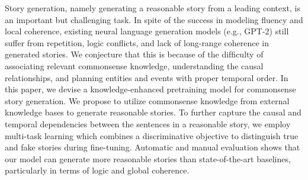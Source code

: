 Story generation, namely generating a reasonable story from a leading context, is an important but challenging task. In spite of the success in modeling fluency and local coherence, existing neural language generation models (e.g., GPT-2) still suffer from repetition, logic conﬂicts, and lack of long-range coherence in generated stories. We conjecture that this is because of the difﬁculty of associating relevant commonsense knowledge, understanding the causal relationships, and planning entities and events with proper temporal order. In this paper, we devise a knowledge-enhanced pretraining model for commonsense story generation. We propose to utilize commonsense knowledge from external knowledge bases to generate reasonable stories. To further capture the causal and temporal dependencies between the sentences in a reasonable story, we employ multi-task learning which combines a discriminative objective to distinguish true and fake stories during ﬁne-tuning. Automatic and manual evaluation shows that our model can generate more reasonable stories than state-of-the-art baselines, particularly in terms of logic and global coherence.